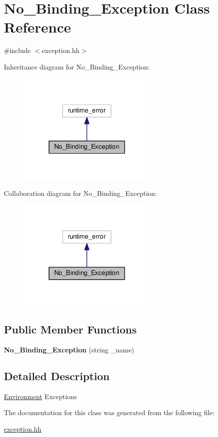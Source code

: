 \hypertarget{classNo__Binding__Exception}{\section{No\-\_\-\-Binding\-\_\-\-Exception Class Reference}
\label{classNo__Binding__Exception}
}


{\ttfamily \#include $<$exception.\-hh$>$}



Inheritance diagram for No\-\_\-\-Binding\-\_\-\-Exception\-:\nopagebreak
\begin{figure}[H]
\begin{center}
\leavevmode
\includegraphics[width=197pt]{classNo__Binding__Exception__inherit__graph}
\end{center}
\end{figure}


Collaboration diagram for No\-\_\-\-Binding\-\_\-\-Exception\-:\nopagebreak
\begin{figure}[H]
\begin{center}
\leavevmode
\includegraphics[width=197pt]{classNo__Binding__Exception__coll__graph}
\end{center}
\end{figure}
\subsection*{Public Member Functions}
\begin{DoxyCompactItemize}
\item 
\hypertarget{classNo__Binding__Exception_a83b63c7e8934d48a3a9476b75552e010}{{\bfseries No\-\_\-\-Binding\-\_\-\-Exception} (string \-\_\-name)}\label{classNo__Binding__Exception_a83b63c7e8934d48a3a9476b75552e010}

\end{DoxyCompactItemize}


\subsection{Detailed Description}
\hyperlink{classEnvironment}{Environment} Exceptions 

The documentation for this class was generated from the following file\-:\begin{DoxyCompactItemize}
\item 
\hyperlink{exception_8hh}{exception.\-hh}\end{DoxyCompactItemize}
